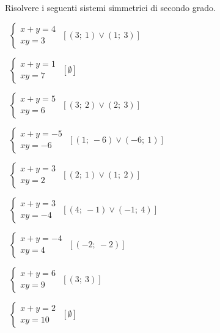 \begin{esercizio}[\Ast]
 \label{ese:6.14}
Risolvere i seguenti sistemi simmetrici di secondo grado.
\begin{multicols}{2}
 \begin{enumeratea}
 \item~$\left\{\begin{array}{l}x+y=4\\{xy}=3\end{array}\right.$
  \hfill$\left[(3;~1)\vee(1;~3)\right]$
 \item~$\left\{\begin{array}{l}x+y=1\\{xy}=7 \end{array}\right.$
  \hfill$\left[\emptyset\right]$
 \item~$\left\{\begin{array}{l}x+y=5\\{xy}=6 \end{array}\right.$
  \hfill$\left[(3;~2)\vee(2;~3)\right]$
 \item~$\left\{\begin{array}{l}x+y=-5\\{xy}=-6 \end{array}\right.$
  \hfill$\left[(1;~-6)\vee(-6;~1)\right]$
 \item~$\left\{\begin{array}{l}x+y=3\\{xy}=2 \end{array}\right.$
  \hfill$\left[(2;~1)\vee(1;~2)\right]$
 \item~$\left\{\begin{array}{l}x+y=3\\{xy}=-4\end{array}\right.$
  \hfill$\left[(4;~-1)\vee(-1;~4)\right]$
 \item~$\left\{\begin{array}{l}x+y=-4\\{xy}=4 \end{array}\right.$
  \hfill$\left[(-2;~-2)\right]$
 \item~$\left\{\begin{array}{l}x+y=6\\{xy}=9 \end{array}\right.$
  \hfill$\left[(3;~3)\right]$
 \item~$\left\{\begin{array}{l}x+y=2\\{xy}=10 \end{array}\right.$
  \hfill$\left[\emptyset\right]$

\end{enumeratea}
\end{multicols}
\end{esercizio}
